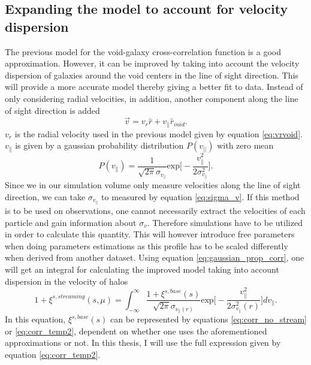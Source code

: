 \subsection{Expanding the model to account for velocity dispersion}
The previous model for the void-galaxy cross-correlation function is a good
approximation. However, it can be improved by taking into account the velocity
dispersion of galaxies around the void centers in the line of sight direction.
This will provide a more accurate model thereby giving a better fit to data.
Instead of only considering radial velocities, in addition, another component along the line
of sight direction is added
\begin{equation}
    \vec{v}=v_r\hat{r}+v_\parallel \hat{r}_{void}.
\end{equation}
$v_r$ is the radial velocity used in the previous model given by equation
\ref{eq:vrvoid}. $v_\parallel$ is given by a gaussian probability distribution
$P(v_{\vert\vert})$ with zero mean
\begin{equation}\label{eq:gaussian_prop_corr}
    P(v_\parallel)=\frac{1}{\sqrt{2\pi}\sigma_{v_{\parallel}}}\mathrm{exp}\Big[-\frac{v_\parallel^2}{2\sigma_{v_\parallel}^2}\Big].
\end{equation}
Since we in our simulation volume only measure velocities along the line of
sight direction, we can take $\sigma_{v_{\parallel}}$ to measured by equation
\ref{eq:sigma_v}. If this method is to be used on observations, one cannot necessarily extract the velocities of each particle and gain information about $\sigma_v$. Therefore simulations have to be utilized in order to calculate this quantity. This will however introduce free parameters when doing parameters estimations as this profile has to be scaled differently when derived from another dataset. Using equation \ref{eq:gaussian_prop_corr}, one will get an integral for calculating the improved
model taking into account dispersion in the velocity of halos \cite{BeyondBAO}
\begin{equation}\label{eq:corr_stream}
    1+\xi^{s,streaming}(s,\mu)=\int_{-\infty}^\infty\frac{1+\xi^{s,base}(s)}{\sqrt{2\pi}\sigma_{v_{\parallel}(r)}}\mathrm{exp}\Big[-\frac{v_\parallel^2}{2\sigma_{v_\parallel}^2(r)}\Big]dv_\parallel.
\end{equation}
In this equation, $\xi^{s,base}(s)$ can be represented by equations \ref{eq:corr_no_stream} or \ref{eq:corr_temp2}, dependent on whether one uses the aforementioned approximations or not. In this thesis, I will use the full expression given by equation \ref{eq:corr_temp2}.
